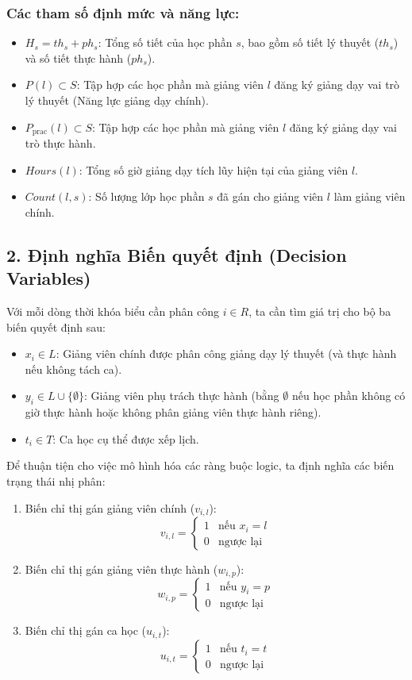 \documentclass{article}
\begin{document}
\subsubsection*{Các tham số định mức và năng lực:}
\begin{itemize}
    \item $H_s = th_s + ph_s$: Tổng số tiết của học phần $s$, bao gồm số tiết lý thuyết ($th_s$) và số tiết thực hành ($ph_s$).
    \item $P(l) \subset S$: Tập hợp các học phần mà giảng viên $l$ đăng ký giảng dạy vai trò lý thuyết (Năng lực giảng dạy chính).
    \item $P_{\text{prac}}(l) \subset S$: Tập hợp các học phần mà giảng viên $l$ đăng ký giảng dạy vai trò thực hành.
    \item $Hours(l)$: Tổng số giờ giảng dạy tích lũy hiện tại của giảng viên $l$.
    \item $Count(l, s)$: Số lượng lớp học phần $s$ đã gán cho giảng viên $l$ làm giảng viên chính.
\end{itemize}

\subsection*{2. Định nghĩa Biến quyết định (Decision Variables)}

Với mỗi dòng thời khóa biểu cần phân công $i \in R$, ta cần tìm giá trị cho bộ ba biến quyết định sau:
\begin{itemize}
    \item $x_i \in L$: Giảng viên chính được phân công giảng dạy lý thuyết (và thực hành nếu không tách ca).
    \item $y_i \in L \cup \{\emptyset\}$: Giảng viên phụ trách thực hành (bằng $\emptyset$ nếu học phần không có giờ thực hành hoặc không phân giảng viên thực hành riêng).
    \item $t_i \in T$: Ca học cụ thể được xếp lịch.
\end{itemize}

Để thuận tiện cho việc mô hình hóa các ràng buộc logic, ta định nghĩa các biến trạng thái nhị phân:
\begin{enumerate}
    \item Biến chỉ thị gán giảng viên chính ($v_{i, l}$):
    \[
    v_{i, l} = \begin{cases} 1 & \text{nếu } x_i = l \\ 0 & \text{ngược lại} \end{cases}
    \]
    \item Biến chỉ thị gán giảng viên thực hành ($w_{i, p}$):
    \[
    w_{i, p} = \begin{cases} 1 & \text{nếu } y_i = p \\ 0 & \text{ngược lại} \end{cases}
    \]
    \item Biến chỉ thị gán ca học ($u_{i, t}$):
    \[
    u_{i, t} = \begin{cases} 1 & \text{nếu } t_i = t \\ 0 & \text{ngược lại} \end{cases}
    \]
\end{enumerate}
\end{document}
